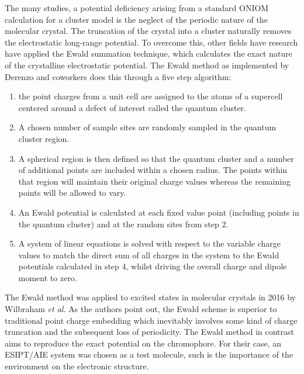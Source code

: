 The many studies, a potential deficiency arising from a standard ONIOM calculation for a cluster model is the neglect of the periodic nature of the molecular crystal. The truncation of the crystal into a cluster naturally removes the electrostatic long-range potential. To overcome this, other fields have research have applied the Ewald summation technique, which calculates the exact nature of the crystalline electrostatic potential.\cite{Weber2010,Stueber2001b} The Ewald method as implemented by Derenzo and coworkers does this through a five step algorithm:\cite{Klintenberg2000,Derenzo2000}  
\begin{enumerate}
    \item the point charges from a unit cell are assigned to the atoms of a supercell centered around a defect of interest called the quantum cluster.
    \item A chosen number of sample sites are randomly sampled in the quantum cluster region.
    \item A spherical region is then defined so that the quantum cluster and a number of additional points are included within a chosen radius. The points within that region will maintain their original charge values whereas the remaining points will be allowed to vary.
    \item An Ewald potential is calculated at each fixed value point (including points in the quantum cluster) and at the random sites from step 2.
    \item A system of linear equations is solved with respect to the variable charge values to match the direct sum of all charges in the system to the Ewald potentials calculated in step 4, whilst driving the overall charge and dipole moment to zero.
\end{enumerate}
The Ewald method was applied to excited states in molecular crystals in 2016 by Wilbraham \textit{et al.}\cite{Wilbraham2016} As the authors point out, the Ewald scheme is superior to traditional point charge embedding which inevitably involves some kind of charge truncation and the subsequent loss of periodicity. The Ewald method in contrast aims to reproduce the exact potential on the chromophore. For their case, an ESIPT/AIE system was chosen as a test molecule, such is the importance of the environment on the electronic structure. 

